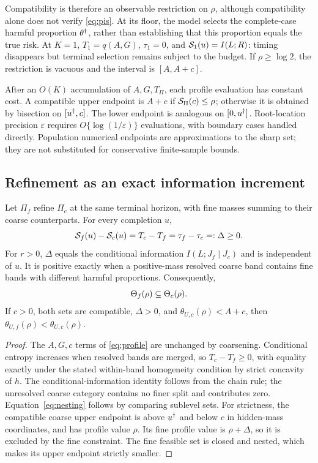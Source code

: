 Compatibility is therefore an observable restriction on $\rho$, although compatibility alone does not verify \eqref{eq:pis}. At its floor, the model selects the complete-case harmful proportion $\theta^\dagger$, rather than establishing that this proportion equals the true risk. At $K=1$, $T_1=q(A,G)$, $\tau_1=0$, and $\mathcal S_1(u)=I(L;R)$: timing disappears but terminal selection remains subject to the budget. If $\rho\ge\log2$, the restriction is vacuous and the interval is $[A,A+c]$.

After an $O(K)$ accumulation of $A,G,T_\Pi$, each profile evaluation has constant cost. A compatible upper endpoint is $A+c$ if $\mathcal S_\Pi(c)\le\rho$; otherwise it is obtained by bisection on $[u^\dagger,c]$. The lower endpoint is analogous on $[0,u^\dagger]$. Root-location precision $\varepsilon$ requires $O\{\log(1/\varepsilon)\}$ evaluations, with boundary cases handled directly. Population numerical endpoints are approximations to the sharp set; they are not substituted for conservative finite-sample bounds.

\subsection{Refinement as an exact information increment}
\begin{theorem}\label{thm:refinement}
Let $\Pi_f$ refine $\Pi_c$ at the same terminal horizon, with fine masses summing to their coarse counterparts. For every completion $u$,
\begin{equation}\label{eq:shift}
 \mathcal S_f(u)-\mathcal S_c(u)=T_c-T_f
 =\tau_f-\tau_c=:\Delta\ge0.
\end{equation}
For $r>0$, $\Delta$ equals the conditional information $I(L;J_f\mid J_c)$ and is independent of $u$. It is positive exactly when a positive-mass resolved coarse band contains fine bands with different harmful proportions. Consequently,
\begin{equation}\label{eq:nesting}
 \Theta_f(\rho)\subseteq\Theta_c(\rho).
\end{equation}
If $c>0$, both sets are compatible, $\Delta>0$, and $\theta_{U,c}(\rho)<A+c$, then $\theta_{U,f}(\rho)<\theta_{U,c}(\rho)$.
\end{theorem}
\begin{proof}
The $A,G,c$ terms of \eqref{eq:profile} are unchanged by coarsening. Conditional entropy increases when resolved bands are merged, so $T_c-T_f\ge0$, with equality exactly under the stated within-band homogeneity condition by strict concavity of $h$. The conditional-information identity follows from the chain rule; the unresolved coarse category contains no finer split and contributes zero. Equation~\eqref{eq:nesting} follows by comparing sublevel sets. For strictness, the compatible coarse upper endpoint is above $u^\dagger$ and below $c$ in hidden-mass coordinates, and has profile value $\rho$. Its fine profile value is $\rho+\Delta$, so it is excluded by the fine constraint. The fine feasible set is closed and nested, which makes its upper endpoint strictly smaller.
\end{proof}

